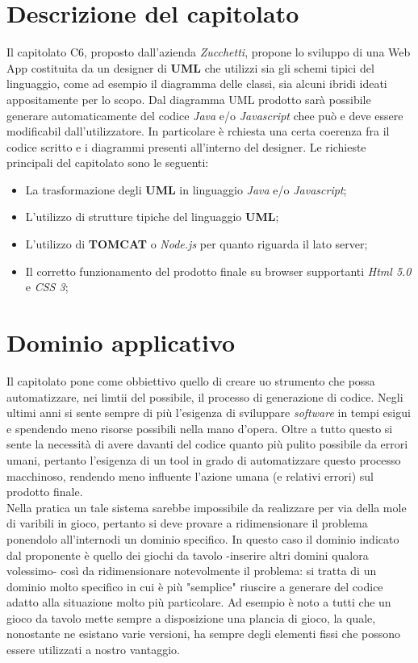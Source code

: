 \documentclass[a4paper]{report}
\begin{document}
      \section{Descrizione del capitolato}
        Il capitolato C6, proposto dall'azienda \emph{Zucchetti}, propone lo sviluppo di una Web App costituita da un designer di \textbf{UML} che utilizzi sia gli schemi tipici
        del linguaggio, come ad esempio il diagramma delle classi, sia alcuni ibridi ideati appositamente per lo scopo.
        Dal diagramma UML prodotto sarà possibile generare automaticamente del codice \emph{Java} e/o \emph{Javascript} chee può e deve essere modificabil dall'utilizzatore.
        In particolare è rchiesta una certa coerenza fra il codice scritto e i diagrammi presenti all'interno del designer.
        Le richieste principali del capitolato sono le seguenti:
        \begin{itemize}
  				\item La trasformazione degli \textbf{UML} in linguaggio \emph{Java} e/o \emph{Javascript};
  				\item L'utilizzo di strutture tipiche del linguaggio \textbf{UML};
  				\item L'utilizzo di \textbf{TOMCAT} o \emph{Node.js} per quanto riguarda il lato server;
          \item Il corretto funzionamento del prodotto finale su browser supportanti \emph{Html 5.0} e \emph{CSS 3};
  		   \end{itemize}
       \section{Dominio applicativo}
        Il capitolato pone come obbiettivo quello di creare uo strumento che possa automatizzare, nei limtii del possibile, il processo di generazione di codice.
        Negli ultimi anni si sente sempre di più l'esigenza di sviluppare \emph{software} in tempi esigui e spendendo meno risorse possibili nella mano d'opera.
        Oltre a tutto questo si sente la necessità di avere davanti del codice quanto più pulito possibile da errori umani, pertanto l'esigenza di un tool in grado di
        automatizzare questo processo macchinoso, rendendo meno influente l'azione umana (e relativi errori) sul prodotto finale. \\
        Nella pratica un tale sistema sarebbe impossibile da realizzare per via della mole di varibili in gioco, pertanto si deve provare a ridimensionare il problema ponendolo
        all'internodi un dominio specifico.
        In questo caso il dominio indicato dal proponente è quello dei giochi da tavolo -inserire altri domini qualora volessimo- così da ridimensionare notevolmente il problema:
        si tratta di un dominio molto specifico in cui è più "semplice" riuscire a generare del codice adatto alla situazione molto più particolare.
        Ad esempio è noto a tutti che un gioco da tavolo mette sempre a disposizione una plancia di gioco, la quale, nonostante ne esistano varie versioni, ha sempre degli
        elementi fissi che possono essere utilizzati a nostro vantaggio.
\end{document}
